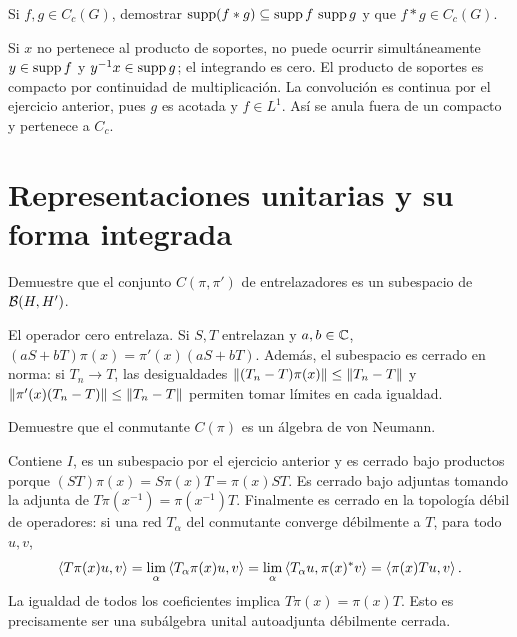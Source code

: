 \begin{ejercicio}\label{ej:v4-l22-5}
Si $f,g\in C_c(G)$, demostrar $\operatorname{supp}(f*g)\subseteq\operatorname{supp} f\,\operatorname{supp} g$ y que $f*g\in C_c(G)$.
\end{ejercicio}
\begin{solucion}
Si $x$ no pertenece al producto de soportes, no puede ocurrir simultáneamente $y\in\operatorname{supp} f$ y $y^{-1}x\in\operatorname{supp} g$; el integrando es cero. El producto de soportes es compacto por continuidad de multiplicación. La convolución es continua por el ejercicio anterior, pues $g$ es acotada y $f\in L^1$. Así se anula fuera de un compacto y pertenece a $C_c$.
\end{solucion}

\chapter{Representaciones unitarias y su forma integrada}

\begin{ejercicio}\label{ej:v4-l23-1}
Demuestre que el conjunto $C(\pi,\pi')$ de entrelazadores es un subespacio de $\mathcal B(H,H')$.
\end{ejercicio}
\begin{solucion}
El operador cero entrelaza. Si $S,T$ entrelazan y $a,b\in\mathbb C$, $(aS+bT)\pi(x)=\pi'(x)(aS+bT)$. Además, el subespacio es cerrado en norma: si $T_n\to T$, las desigualdades $\left\lVert(T_n-T)\pi(x)\right\rVert\leq\left\lVert T_n-T\right\rVert$ y $\left\lVert\pi'(x)(T_n-T)\right\rVert\leq\left\lVert T_n-T\right\rVert$ permiten tomar límites en cada igualdad.
\end{solucion}

\begin{ejercicio}\label{ej:v4-l23-2}
Demuestre que el conmutante $C(\pi)$ es un álgebra de von Neumann.
\end{ejercicio}
\begin{solucion}
Contiene $I$, es un subespacio por el ejercicio anterior y es cerrado bajo productos porque $(ST)\pi(x)=S\pi(x)T=\pi(x)ST$. Es cerrado bajo adjuntas tomando la adjunta de $T\pi(x^{-1})=\pi(x^{-1})T$. Finalmente es cerrado en la topología débil de operadores: si una red $T_\alpha$ del conmutante converge débilmente a $T$, para todo $u,v$,
\[
\left\langle T\pi(x)u,v\right\rangle=\lim_\alpha\left\langle T_\alpha\pi(x)u,v\right\rangle
=\lim_\alpha\left\langle T_\alpha u,\pi(x)^*v\right\rangle
=\left\langle\pi(x)Tu,v\right\rangle.
\]
La igualdad de todos los coeficientes implica $T\pi(x)=\pi(x)T$. Esto es precisamente ser una subálgebra unital autoadjunta débilmente cerrada.
\end{solucion}

